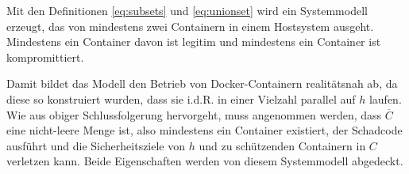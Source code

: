 \documentclass[../main.tex]{subfiles}
\begin{document}

    Mit den Definitionen \ref{eq:subsets} und \ref{eq:unionset} wird ein Systemmodell erzeugt, das von mindestens zwei Containern in einem Hostsystem ausgeht. Mindestens ein Container \cvalid{} davon ist legitim und mindestens ein Container \cbroken{} ist kompromittiert.

    Damit bildet das Modell den Betrieb von Docker-Containern realitätsnah ab, da diese so konstruiert wurden, dass sie i.d.R. in einer Vielzahl parallel auf \(h\) laufen. Wie aus obiger Schlussfolgerung hervorgeht, muss angenommen werden, dass \(\overline{C}\) eine nicht-leere Menge ist, also mindestens ein Container \cbroken{} existiert, der Schadcode ausführt und die Sicherheitsziele von \(h\) und zu schützenden Containern in \(C\) verletzen kann. Beide Eigenschaften werden von diesem Systemmodell abgedeckt.


\end{document}
